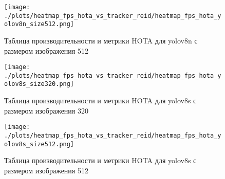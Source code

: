 \begin{figure}[ht]
  \centering
  \texttt{[image: ./plots/heatmap\_fps\_hota\_vs\_tracker\_reid/heatmap\_fps\_hota\_yolov8n\_size512.png]}
  \caption{Таблица производительности и метрики HOTA для yolov8n с размером изображения 512}
  \label{fig:fps_hota_n512}
\end{figure}


\begin{figure}[ht]
  \centering
  \texttt{[image: ./plots/heatmap\_fps\_hota\_vs\_tracker\_reid/heatmap\_fps\_hota\_yolov8s\_size320.png]}
  \caption{Таблица производительности и метрики HOTA для yolov8s с размером изображения 320}
  \label{fig:fps_hota_s320}
\end{figure}

\begin{figure}[ht]
  \centering
  \texttt{[image: ./plots/heatmap\_fps\_hota\_vs\_tracker\_reid/heatmap\_fps\_hota\_yolov8s\_size512.png]}
  \caption{Таблица производительности и метрики HOTA для yolov8s с размером изображения 512}
  \label{fig:fps_hota_s512}
\end{figure}




